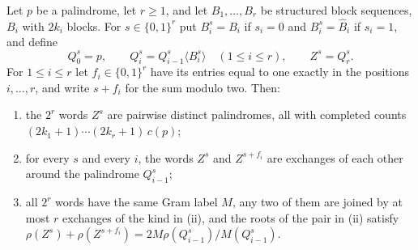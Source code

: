 \begin{theorem}
\label{thm:nested-cubes}
Let $p$ be a palindrome, let $r\geqslant1$, and let $B_1,\dots,B_r$ be structured block sequences,
$B_i$ with $2k_i$ blocks. For $s\in\{0,1\}^r$ put $B_i^s=B_i$ if $s_i=0$ and $B_i^s=\widehat B_i$
if $s_i=1$, and define
$$
 Q_0^s=p,\qquad Q_i^s=Q_{i-1}^s\langle B_i^s\rangle\quad(1\leqslant i\leqslant r),\qquad Z^s=Q_r^s .
$$
For $1\leqslant i\leqslant r$ let $f_i\in\{0,1\}^r$ have its entries equal to one exactly in the
positions $i,\dots,r$, and write $s+f_i$ for the sum modulo two. Then:
\begin{enumerate}[label=\textup{(\roman*)}]
\item the $2^r$ words $Z^s$ are pairwise distinct palindromes, all with completed counts
 $(2k_1+1)\cdots(2k_r+1)\,c(p)$;
\item for every $s$ and every $i$, the words $Z^s$ and $Z^{s+f_i}$ are exchanges of each other
 around the palindrome $Q_{i-1}^s$;
\item all $2^r$ words have the same Gram label $M$, any two of them are joined by at most $r$
 exchanges of the kind in \textup{(ii)}, and the roots of the pair in \textup{(ii)} satisfy
 $\rho(Z^s)+\rho(Z^{s+f_i})=2M\rho(Q_{i-1}^s)/M(Q_{i-1}^s)$.
\end{enumerate}
\end{theorem}


